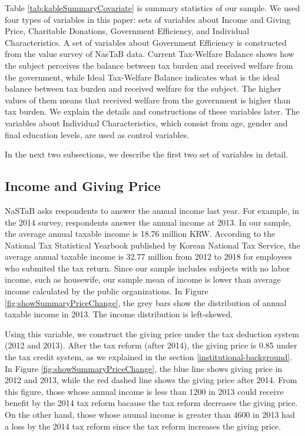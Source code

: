 \documentclass[ review  , 3p ]{elsarticle}
\begin{document}
  \color{red}

  Table \ref{tab:kableSummaryCovariate} is summary statistics of our sample.
  We used four types of variables in this paper:
  sets of variables about Income and Giving Price,
  Charitable Donations,
  Government Efficiency,
  and Individual Characteristics.
  A set of variables about Government Efficiency is constructed from the value survey of NasTaB data.
  Current Tax-Welfare Balance shows how the subject perceives the balance between tax burden and received welfare from the government,
  while Ideal Tax-Welfare Balance indicates what is the ideal balance between tax burden and received welfare for the subject.
  The higher values of them means that received welfare from the government is higher than tax burden.
  We explain the details and constructions of these variables later.
  The variables about Individual Characteristics,
  which consist from age, gender and final education levels, are used as control variables.

  In the next two subsections,
  we describe the first two set of variables in detail.

  \hypertarget{income-and-giving-price}{%
  \subsection{Income and Giving Price}\label{income-and-giving-price}}

  NaSTaB asks respondents to answer the annual income last year.
  For example, in the 2014 survey, respondents answer the annual income at 2013.
  In our sample, the average annual taxable income is 18.76 million KRW.
  According to the National Tax Statistical Yearbook published by Korean National Tax Service,
  the average annual taxable income is 32.77 million from 2012 to 2018
  for employees who submited the tax return.
  Since our sample includes subjects with no labor income, such as housewife,
  our sample mean of income is lower than average income calculated by the public organizations.
  In Figure \ref{fig:showSummaryPriceChange},
  the grey bars show the distribution of annual taxable income in 2013.
  The income distribution is left-skewed.

  Using this variable, we construct the giving price under the tax deduction system (2012 and 2013).
  After the tax reform (after 2014), the giving price is 0.85 under the tax credit system,
  as we explained in the section \ref{institutional-background}.
  In Figure \ref{fig:showSummaryPriceChange},
  the blue line shows giving price in 2012 and 2013,
  while the red dashed line shows the giving price after 2014.
  From this figure,
  those whose annual income is less than 1200 in 2013 could receive benefit by the 2014 tax reform
  bacause the tax reform decreases the giving price.
  On the other hand,
  those whose auunal income is greater than 4600 in 2013 had a loss by the 2014 tax reform
  since the tax reform increases the giving price.
\end{document}
